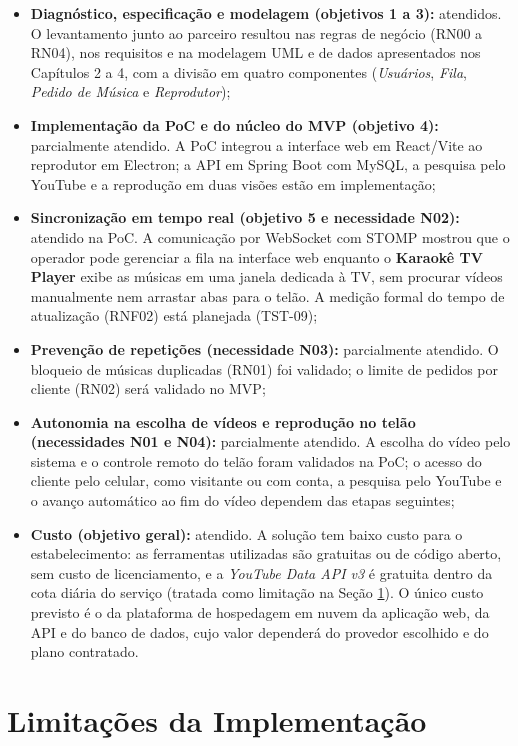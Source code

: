 \begin{itemize}
  \item \textbf{Diagnóstico, especificação e modelagem (objetivos 1 a 3):} atendidos. O levantamento junto ao parceiro resultou nas regras de negócio (RN00 a RN04), nos requisitos e na modelagem UML e de dados apresentados nos Capítulos 2 a 4, com a divisão em quatro componentes (\textit{Usuários}, \textit{Fila}, \textit{Pedido de Música} e \textit{Reprodutor});
  \item \textbf{Implementação da PoC e do núcleo do MVP (objetivo 4):} parcialmente atendido. A PoC integrou a interface web em React/Vite ao reprodutor em Electron; a API em Spring Boot com MySQL, a pesquisa pelo YouTube e a reprodução em duas visões estão em implementação;
  \item \textbf{Sincronização em tempo real (objetivo 5 e necessidade N02):} atendido na PoC. A comunicação por WebSocket com STOMP mostrou que o operador pode gerenciar a fila na interface web enquanto o \textbf{Karaokê TV Player} exibe as músicas em uma janela dedicada à TV, sem procurar vídeos manualmente nem arrastar abas para o telão. A medição formal do tempo de atualização (RNF02) está planejada (TST-09);
  \item \textbf{Prevenção de repetições (necessidade N03):} parcialmente atendido. O bloqueio de músicas duplicadas (RN01) foi validado; o limite de pedidos por cliente (RN02) será validado no MVP;
  \item \textbf{Autonomia na escolha de vídeos e reprodução no telão (necessidades N01 e N04):} parcialmente atendido. A escolha do vídeo pelo sistema e o controle remoto do telão foram validados na PoC; o acesso do cliente pelo celular, como visitante ou com conta, a pesquisa pelo YouTube e o avanço automático ao fim do vídeo dependem das etapas seguintes;
  \item \textbf{Custo (objetivo geral):} atendido. A solução tem baixo custo para o estabelecimento: as ferramentas utilizadas são gratuitas ou de código aberto, sem custo de licenciamento, e a \textit{YouTube Data API v3} é gratuita dentro da cota diária do serviço (tratada como limitação na Seção \ref{sec:limitacoes}). O único custo previsto é o da plataforma de hospedagem em nuvem da aplicação web, da API e do banco de dados, cujo valor dependerá do provedor escolhido e do plano contratado.
\end{itemize}

\section{Limitações da Implementação} \label{sec:limitacoes}

